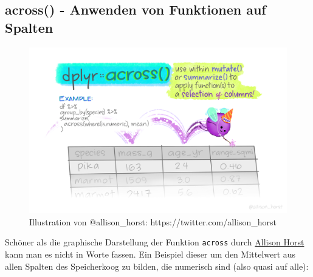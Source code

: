 \documentclass[
]{article}
\begin{document}
\hypertarget{across---anwenden-von-funktionen-auf-spalten}{%
\subsection{across() - Anwenden von Funktionen auf Spalten}\label{across---anwenden-von-funktionen-auf-spalten}}

\begin{figure}

{\centering \includegraphics[width=75.88in]{images/043} 

}

\caption{Illustration von @allison_horst: https://twitter.com/allison_horst}\label{fig:unnamed-chunk-144}
\end{figure}

Schöner als die graphische Darstellung der Funktion \texttt{across} durch \href{https://twitter.com/allison_horst?lang=de}{Allison Horst} kann man es nicht in Worte fassen. Ein Beispiel dieser um den Mittelwert aus allen Spalten des Speicherkoog zu bilden, die numerisch sind (also quasi auf alle):
\end{document}
